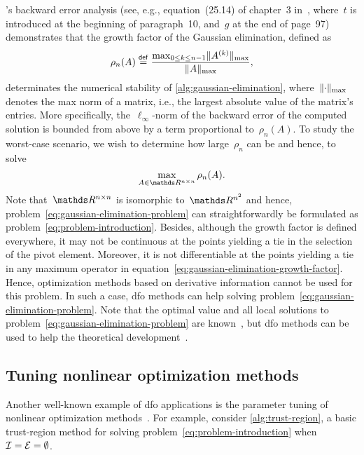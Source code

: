 's backward error analysis (see, e.g., equation~(25.14) of chapter~3 in~\cite{Wilkinson_1963}, where~$t$ is introduced at the beginning of paragraph~10, and~$g$ at the end of page~97) demonstrates that the growth factor of the Gaussian elimination, defined as
\begin{equation}
    \label{eq:gaussian-elimination-growth-factor}
    \rho_n(A) \mathrel{\stackrel{\mathsf{def}}{=}} \frac{\max_{0 \le k \le n - 1} \lVert A^{(k)}\rVert_{\max}}{\lVert A\rVert_{\max}},
\end{equation}
determinates the numerical stability of \cref{alg:gaussian-elimination}, where~$\lVert\cdot\rVert_{\max}$ denotes the max norm of a matrix, i.e., the largest absolute value of the matrix's entries.
More specifically, the~$\ell_{\infty}$-norm of the backward error of the computed solution is bounded from above by a term proportional to~$\rho_n(A)$.
To study the worst-case scenario, we wish to determine how large~$\rho_n$ can be and hence, to solve
\begin{equation}
    \label{eq:gaussian-elimination-problem}
    \max_{A \in \R^{n \times n}} \rho_n(A).
\end{equation}
Note that~$\R^{n \times n}$ is isomorphic to~$\R^{n^2}$ and hence, problem~\cref{eq:gaussian-elimination-problem} can straightforwardly be formulated as problem~\cref{eq:problem-introduction}.
Besides, although the growth factor is defined everywhere, it may not be continuous at the points yielding a tie in the selection of the pivot element.
Moreover, it is not differentiable at the points yielding a tie in any maximum operator in equation~\cref{eq:gaussian-elimination-growth-factor}.
Hence, optimization methods based on derivative information cannot be used for this problem.
In such a case, \gls{dfo} methods can help solving problem~\cref{eq:gaussian-elimination-problem}.
Note that the optimal value and all local solutions to problem~\cref{eq:gaussian-elimination-problem} are known~\cite{Higham_Higham_1989}, but \gls{dfo} methods can be used to help the theoretical development~\cite{Higham_1993}.

\subsection{Tuning nonlinear optimization methods}

Another well-known example of \gls{dfo} applications is the parameter tuning of nonlinear optimization methods~\cite{Audet_Orban_2006}.
For example, consider \cref{alg:trust-region}, a basic trust-region method for solving problem~\cref{eq:problem-introduction} when~$\mathcal{I} = \mathcal{E} = \emptyset$.

